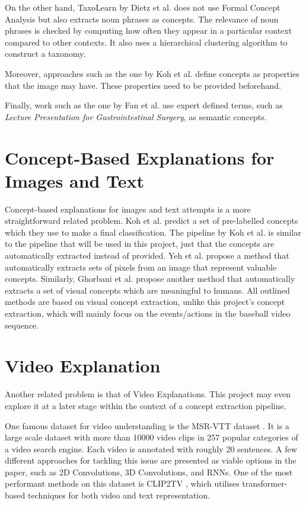 On the other hand, TaxoLearn \cite{RefWorks:RefID:34-dietz2012taxolearn} by Dietz et al. does not use Formal Concept Analysis but also extracts noun phrases as concepts. The relevance of noun phrases is checked by computing how often they appear in a particular context compared to other contexts. It also uses a hierarchical clustering algorithm to construct a taxonomy.

Moreover, approaches such as the one by Koh et al. \cite{RefWorks:RefID:35-koh2020concept} define concepts as properties that the image may have. These properties need to be provided beforehand.

Finally, work such as the one by Fan et al. \cite{RefWorks:RefID:50-fan2004semantic} use expert defined terms, such as \emph{Lecture Presentation for Gastrointestinal Surgery}, as semantic concepts. 


\section{Concept-Based Explanations for Images and Text}

Concept-based explanations for images and text attempts is a more straightforward related problem.
Koh et al. \cite{RefWorks:RefID:35-koh2020concept} predict a set of pre-labelled concepts which they use to make a final classification.
The pipeline by Koh et al. is similar to the pipeline that will be used in this project, just that the concepts are automatically extracted instead of provided.
Yeh et al. \cite{RefWorks:RefID:36-yeh2019completeness-aware} propose a method that automatically extracts sets of pixels from an image that represent valuable concepts.
Similarly, Ghorbani et al. \cite{RefWorks:RefID:37-ghorbani2019automatic} propose another method that automatically extracts a set of visual concepts which are meaningful to humans.
All outlined methods are based on visual concept extraction, unlike this project's concept extraction, which will mainly focus on the events/actions in the baseball video sequence.


\section{Video Explanation}

Another related problem is that of Video Explanations. This project may even explore it at a later stage within the context of a concept extraction pipeline.

One famous dataset for video understanding is the MSR-VTT dataset \cite{RefWorks:RefID:40-jun2016msr-vtt:}. It is a large scale dataset with more than 10000 video clips in 257 popular categories of a video search engine.
Each video is annotated with roughly 20 sentences. 
A few different approaches for tackling this issue are presented as viable options in the paper, such as 2D Convolutions, 3D Convolutions, and RNNs.
One of the most performant methods on this dataset is CLIP2TV \cite{RefWorks:RefID:41-gao2021clip2tv:}, which utilises transformer-based techniques for both video and text representation.


